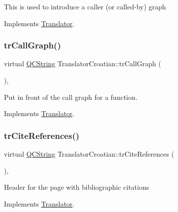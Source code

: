 This is used to introduce a caller (or called-\/by) graph 

Implements \mbox{\hyperlink{class_translator}{Translator}}.

\mbox{\label{class_translator_croatian_a723e2ef503d3a4da00dcb34b19178c20}} 
\subsubsection{\texorpdfstring{trCallGraph()}{trCallGraph()}}
{\footnotesize\ttfamily virtual \mbox{\hyperlink{class_q_c_string}{Q\+C\+String}} Translator\+Croatian\+::tr\+Call\+Graph (\begin{DoxyParamCaption}{ }\end{DoxyParamCaption})\hspace{0.3cm}{\ttfamily [inline]}, {\ttfamily [virtual]}}

Put in front of the call graph for a function. 

Implements \mbox{\hyperlink{class_translator}{Translator}}.

\mbox{\label{class_translator_croatian_ac1c1497f155e733a23d30ce572300759}} 
\subsubsection{\texorpdfstring{trCiteReferences()}{trCiteReferences()}}
{\footnotesize\ttfamily virtual \mbox{\hyperlink{class_q_c_string}{Q\+C\+String}} Translator\+Croatian\+::tr\+Cite\+References (\begin{DoxyParamCaption}{ }\end{DoxyParamCaption})\hspace{0.3cm}{\ttfamily [inline]}, {\ttfamily [virtual]}}

Header for the page with bibliographic citations 

Implements \mbox{\hyperlink{class_translator}{Translator}}.

\mbox{\label{class_translator_croatian_a152e3ac2d8c5f9fe28436d323d15bf8f}} 
